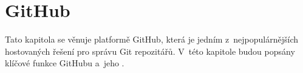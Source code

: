 
\chapter{GitHub}
\label{chap:github}
Tato kapitola se věnuje platformě GitHub, která je jedním z~nejpopulárnějších hostovaných řešení pro správu Git repozitářů. V~této kapitole budou popsány klíčové funkce GitHubu a~jeho \API{}.



